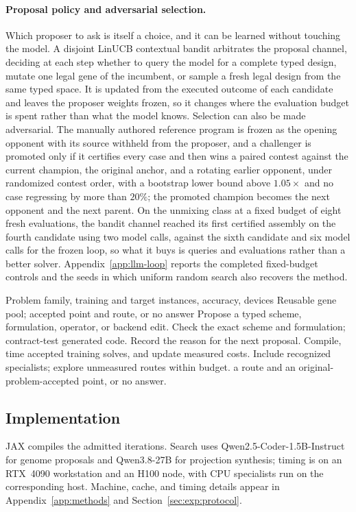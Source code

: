 \paragraph{Proposal policy and adversarial selection.} Which proposer to ask is
itself a choice, and it can be learned without touching the model. A disjoint
LinUCB contextual bandit \citep{li2010linucb} arbitrates the proposal channel,
deciding at each step whether to query the model for a complete typed design,
mutate one legal gene of the incumbent, or sample a fresh legal design from the
same typed space. It is updated from the executed outcome of each candidate and
leaves the proposer weights frozen, so it changes where the evaluation budget is
spent rather than what the model knows. Selection can also be made adversarial.
The manually authored reference program is frozen as the opening opponent with
its source withheld from the proposer, and a challenger is promoted only if it
certifies every case and then wins a paired contest against the current
champion, the original anchor, and a rotating earlier opponent, under randomized
contest order, with a bootstrap lower bound above $1.05\times$ and no case
regressing by more than $20\%$; the promoted champion becomes the next opponent
and the next parent. On the unmixing class at a fixed budget of eight fresh
evaluations, the bandit channel reached its first certified assembly on the
fourth candidate using two model calls, against the sixth candidate and six
model calls for the frozen loop, so what it buys is queries and evaluations
rather than a better solver. Appendix~\ref{app:llm-loop} reports the
completed fixed-budget controls and the seeds in which uniform
random search also recovers the method.

\begin{algorithm}[H]
\caption{OptEvolve: search, certify, measure, and route.}
\label{alg:optevolve}
\small
\begin{algorithmic}[1]
\Require Problem family, training and target instances, accuracy, devices
\Ensure Reusable gene pool; accepted point and route, or no answer
  \State Propose a typed scheme, formulation, operator, or backend edit.
  \State Check the exact scheme and formulation; contract-test generated code.
   \State Record the reason for the next proposal.
  \Else \State Compile, time accepted training solves, and update measured costs.
  \EndIf
\EndWhile
\State Include recognized specialists; explore unmeasured routes within budget.
\State \Return a route and an original-problem-accepted point, or no answer.
\end{algorithmic}
\end{algorithm}

\subsection{Implementation}
JAX compiles the admitted iterations. Search uses Qwen2.5-Coder-1.5B-Instruct for genome proposals and Qwen3.8-27B for projection synthesis; timing is on an RTX~4090 workstation and an H100 node, with CPU specialists run on the corresponding host. Machine, cache, and timing details appear in Appendix~\ref{app:methods} and Section~\ref{sec:exp:protocol}.



